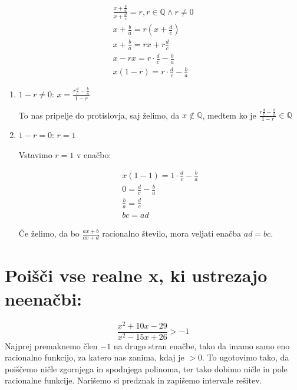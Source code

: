 \documentclass[12pt,a4paper,slovene]{article}
\begin{document}
\begin{equation*}
	\begin{gathered}
		\frac{x + \frac{b}{a}}{x + \frac{d}{c}} = r, r \in \mathbb{Q} \wedge r \neq 0\\
		x + \frac{b}{a} = r (x + \frac{d}{c})\\
		x + \frac{b}{a} = rx + r \frac{d}{c}\\
		x - rx = r \cdot \frac{d}{c} - \frac{b}{a}\\
		x (1- r) = r \cdot \frac{d}{c} - \frac{b}{a}
	\end{gathered}	
\end{equation*}
\begin{enumerate}
	\item $1 - r \neq 0$: $x = \frac{r \frac{d}{c} - \frac{b}{a}}{1 - r}$
	
	To nas pripelje do protislovja, saj želimo, da $x \notin \mathbb{Q}$, medtem ko je $\frac{r \frac{d}{c} - \frac{b}{a}}{1 - r} \in \mathbb{Q}$ 
	
	\item $1 - r = 0$: $r = 1$
	
	Vstavimo $r = 1$ v enačbo:
	
	\begin{equation*}
		\begin{gathered}
			x (1 - 1) = 1 \cdot \frac{d}{c} - \frac{b}{a}\\
 			0 = \frac{d}{c} - \frac{b}{a}\\
 			\frac{b}{a} = \frac{d}{c}\\
 			bc = ad
		\end{gathered}	
	\end{equation*}
	
	Če želimo, da bo $\frac{ax + b}{cx + d}$ racionalno število, mora veljati enačba $ad = bc$.
\end{enumerate}

\section{Poišči vse realne x, ki ustrezajo neenačbi:}
\[
\frac{x^2 + 10x - 29}{x^2 - 15x + 26} > -1
\]
Najprej premaknemo člen $-1$ na drugo stran enačbe, tako da imamo samo eno racionalno funkcijo, za katero nas zanima, kdaj je $> 0$. To ugotovimo tako, da poiščemo ničle zgornjega in spodnjega polinoma, ter tako dobimo ničle in pole racionalne funkcije. Narišemo si predznak in zapišemo intervale rešitev.
\end{document}
